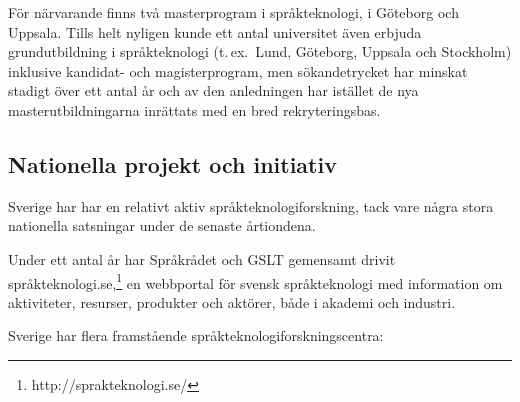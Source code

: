 \begin{multicols}{2}
För närvarande finns två masterprogram i språkteknologi, i Göteborg
och Uppsala. Tills helt nyligen kunde ett antal universitet även
erbjuda grundutbildning i språkteknologi (t.\,ex.~Lund, Göteborg,
Uppsala och Stockholm) inklusive kandidat- och magisterprogram, men
sökandetrycket har minskat stadigt över ett antal år och av den
anledningen har istället de nya masterutbildningarna inrättats med en
bred rekryteringsbas.


\subsection{Nationella projekt och initiativ}

Sverige har har en relativt aktiv språkteknologiforskning, tack vare
några stora nationella satsningar under de senaste årtiondena.

Under ett antal år har Språkrådet och GSLT gemensamt drivit
språkteknologi.se,\footnote{http://sprakteknologi.se/} en webbportal
för svensk språkteknologi med information om aktivi\-teter, resurser,
produkter och aktörer, både i akademi och industri.

Sverige har flera framstående språkteknologi\-forsknings\-centra:


\end{multicols}
